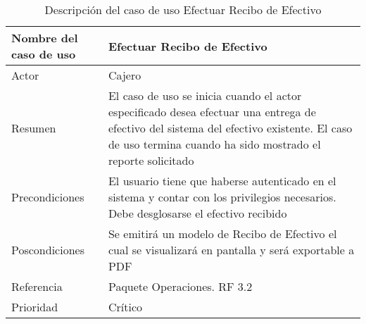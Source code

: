 \begin{table}[H]
	\sf
	\begin{supertabular}{|p{4.5cm}|p{12cm}|}
		\hline
		\textbf{Nombre del caso de uso}
		& \textbf{Efectuar Recibo de Efectivo} \\ \hline
		
		Actor
		& Cajero \\ \hline
		
		Resumen
		& El caso de uso se inicia cuando el actor especificado desea efectuar una entrega de efectivo del sistema del efectivo existente. El caso de uso termina cuando ha sido mostrado el reporte solicitado \\ \hline
		
		Precondiciones
		& El usuario tiene que haberse autenticado en el sistema y contar con los privilegios necesarios. Debe desglosarse el efectivo recibido \\ \hline
		
		Poscondiciones
		& Se emitirá un modelo de Recibo de Efectivo el cual se visualizará en pantalla y será exportable a PDF \\ \hline
		
		Referencia
		& Paquete Operaciones. RF 3.2 \\ \hline
		
		Prioridad
		& Crítico \\		
		\hline
	\end{supertabular}
	\caption[Descripción del caso de uso Efectuar Recibo de Efectivo]{Descripción del caso de uso Efectuar Recibo de Efectivo}
	\label{table:CU_EfectRecEfect}
\end{table}

